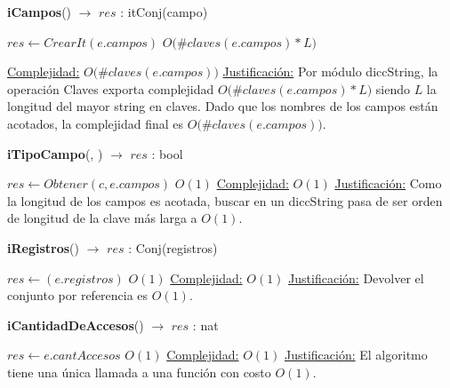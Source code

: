 \begin{Algoritmos}
\begin{algorithm}[H]{\textbf{iCampos}() $\to$ $res$ : itConj(campo)}
      \begin{algorithmic}
        \State $res \gets CrearIt(e.campos)$         \Comment $O\big(\#claves(e.campos) * L\big)$

        \medskip
        \Statex \underline{Complejidad:} {$O\big(\#claves(e.campos)\big)$}
        \Statex \underline{Justificación:} {Por módulo diccString, la operación Claves exporta complejidad $O\big(\#claves(e.campos) * L\big)$ siendo $L$ la longitud del mayor string en claves. Dado que los nombres de los campos están acotados, la complejidad final es $O\big(\#claves(e.campos)\big)$.
}
      \end{algorithmic}
\end{algorithm}

\begin{algorithm}[H]{\textbf{iTipoCampo}(, ) $\to$ $res$ : bool}
      \begin{algorithmic}
      \State $res \gets Obtener(c, e.campos)$         \Comment $O(1)$
      \medskip
      \Statex \underline{Complejidad:} {$O(1)$}
      \Statex \underline{Justificación:} {Como la longitud de los campos es acotada, buscar en un diccString pasa de ser orden de longitud de la clave más larga a $O(1)$.}
      \end{algorithmic}
\end{algorithm}

\begin{algorithm}[H]{\textbf{iRegistros}() $\to$ $res$ : Conj(registros)}
      \begin{algorithmic}
      \State $res \gets (e.registros)$         \Comment $O(1)$
      \medskip
      \Statex \underline{Complejidad:} {$O(1)$}
      \Statex \underline{Justificación:} {Devolver el conjunto por referencia es $O(1)$.}
      \end{algorithmic}
\end{algorithm}

\begin{algorithm}[H]{\textbf{iCantidadDeAccesos}() $\to$ $res$ : nat}
      \begin{algorithmic}
      \State $res \gets e.cantAccesos$         \Comment $O(1)$
      \medskip
      \Statex \underline{Complejidad:} {$O(1)$}
      \Statex \underline{Justificación:} {El algoritmo tiene una única llamada a una función con costo $O(1)$.}
      \end{algorithmic}
\end{algorithm}


\end{Algoritmos}
